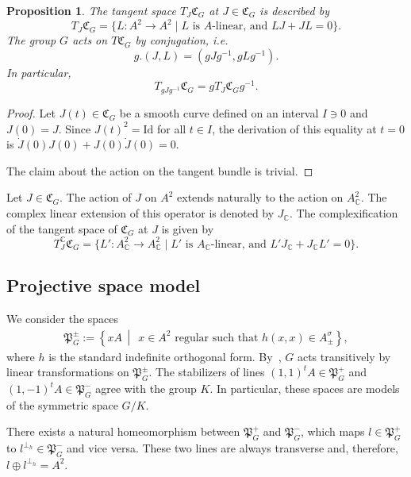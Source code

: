 \documentclass[oneside,11pt]{amsart}
\newtheorem{prop}[thm]{Proposition}
\theoremstyle{definition}
\theoremstyle{remark}
\newcommand{\midwd}{\,\middle\vert\,}
\numberwithin{thm}{section}
\numberwithin{equation}{section}
\begin{document}
\begin{prop}\label{prop:tangent_sio}
    The tangent space $T_J\mathfrak{C}_G$ at $J\in \mathfrak{C}_G$ is described by
    $$T_J\mathfrak{C}_G=\{L\colon A^2\to A^2\mid \text{$L$ is $A$-linear, and }LJ+JL=0\}.$$
    The group $G$ acts on $T\mathfrak{C}_G$  by conjugation, i.e. 
    $$
    g.(J,L)=(gJg^{-1},gLg^{-1}).
    $$ 
    In particular, 
    $$
    T_{gJg^{-1}}\mathfrak{C}_G = gT_J\mathfrak{C}_Gg^{-1}.
    $$
\end{prop}

\begin{proof}
    Let $J(t)\in\mathfrak{C}_G$ be a smooth curve defined on an interval $I\ni 0$ and $J(0)=J$. Since $J(t)^2=\mathrm{Id}$ for all $t\in I$, the derivation of this equality at $t=0$ is $\dot J(0) J(0)+ J(0)\dot J(0)=0$.

    \noindent The claim about the action on the tangent bundle is trivial. 
\end{proof}


Let $J\in\mathfrak{C}_G$. The action of $J$ on $A^2$ extends naturally to the action on $A_\mathbb C^2$. The complex linear extension of this operator is denoted by $J_{\mathbb C}$. The complexification of the tangent space of $\mathfrak C_G$ at $J$ is given by
$$T_J^\mathbb C\mathfrak{C}_G=\{L'\colon A_\mathbb C^2\to A_\mathbb C^2\mid \text{$L'$ is $A_\mathbb C$-linear, and }L'J_\mathbb C+J_\mathbb CL'=0\}.$$

\subsection{Projective space model}\label{sec:projective_O}

We consider the spaces
\begin{align*}
    \mathfrak{P}_G^\pm:=\left\{xA\midwd\; x\in A^{2}\text{ regular such that }h(x,x)\in A^\sigma_{\pm} \right\},
\end{align*}
where $h$ is the standard indefinite orthogonal form. By~\cite[Section~5.3]{ABRRW}, $G$ acts transitively  by linear transformations on $\mathfrak{P}_G^\pm$. The stabilizers of lines $(1,1)^tA\in\mathfrak{P}_G^+$ and $(1,-1)^tA\in\mathfrak{P}_G^-$ agree with the group $K$. In particular, these spaces are models of the symmetric space $G/K$.

There exists a natural homeomorphism between $\mathfrak{P}_G^+$ and $\mathfrak{P}_G^-$, which maps $l\in\mathfrak{P}_G^+$ to $l^{\perp_h}\in \mathfrak{P}_G^-$ and vice versa. These two lines are always transverse and, therefore, $l\oplus l^{\perp_h}= A^2$. 
\end{document}
